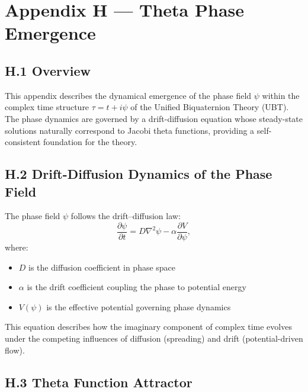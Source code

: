 
\appendix
\section*{Appendix H — Theta Phase Emergence}

\subsection*{H.1 Overview}

This appendix describes the dynamical emergence of the phase field $\psi$ within the complex time structure $\tau = t + i\psi$ of the Unified Biquaternion Theory (UBT). The phase dynamics are governed by a drift-diffusion equation whose steady-state solutions naturally correspond to Jacobi theta functions, providing a self-consistent foundation for the theory.

\subsection*{H.2 Drift-Diffusion Dynamics of the Phase Field}

The phase field $\psi$ follows the drift–diffusion law:
\begin{equation}
\label{eq:drift_diffusion}
\frac{\partial \psi}{\partial t} = D \nabla^2 \psi - \alpha \frac{\partial V}{\partial \psi},
\end{equation}
where:
\begin{itemize}
\item $D$ is the diffusion coefficient in phase space
\item $\alpha$ is the drift coefficient coupling the phase to potential energy
\item $V(\psi)$ is the effective potential governing phase dynamics
\end{itemize}

This equation describes how the imaginary component of complex time evolves under the competing influences of diffusion (spreading) and drift (potential-driven flow).

\subsection*{H.3 Theta Function Attractor}

